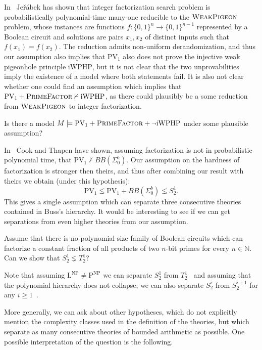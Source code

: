 \documentclass{lmcs}
\newcommand{\PV}{\text{PV}}
\newcommand{\PrimeFactor}{\textsc{PrimeFactor}}
\newcommand{\NN}{\mathbb{N}}
\begin{document}
In~\cite{JERABEK2016380} Jeřábek has shown that integer factorization search problem is probabilistically polynomial-time many-one reducible to the $\textsc{WeakPigeon}$ problem, whose instances are functions $f:\{0,1\}^n\to \{0,1\}^{n-1}$ represented by a Boolean circuit and solutions are pairs $x_1,x_2$ of distinct inputs such that $f(x_1)=f(x_2)$. The reduction admits non-uniform derandomization, and thus our assumption also implies that $\text{PV}_1$ also does not prove the injective weak pigeonhole principle $\text{iWPHP}$, but it is not clear that the two unprovabilities imply the existence of a model where both statements fail. It is also not clear whether one could find an assumption which implies that $\PV_1 +\PrimeFactor\nvdash \text{iWPHP}$, as there could plausibly be a some reduction from $\textsc{WeakPigeon}$ to integer factorization.
\begin{qu}
    Is there a model $M\models \text{PV}_1+\PrimeFactor+\lnot\text{iWPHP}$ under some plausible assumption?
\end{qu}

In~\cite{cookthapen2006} Cook and Thapen have shown, assuming factorization is not in probabilistic polynomial time, that $\PV_1 \nvdash BB(\Sigma^b_0)$. Our assumption on the hardness of factorization is stronger then theirs, and thus after combining our result with theirs we obtain (under this hypothesis):
\[ \PV_1 \lneq \PV_1+ BB(\Sigma^b_0) \lneq S^1_2.\]
This gives a single assumption which can separate three consecutive theories contained in Buss's hierarchy. It would be interesting to see if we can get separations from even higher theories from our assumption.

\begin{qu}
    Assume that there is no polynomial-size family of Boolean circuits which can factorize a constant fraction of all products of two $n$-bit primes for every $n\in\NN$. Can we show that  $S^1_2\lneq T^1_2$?
\end{qu}

Note that assuming $\text{L}^{\text{NP}} \neq \text{P}^{\text{NP}}$ we can separate $S^1_2$ from $T^1_2$~\cite{krajivcek1993fragments} and assuming that the polynomial hierarchy does not collapse, we can also separate $S^i_2$ from $S^{i+1}_2$ for any $i\geq 1$~\cite{krajicek1991bounded}. 

More generally, we can ask about other hypotheses, which do not explicitly mention the complexity classes used in the definition of the theories, but which separate as many consecutive theories of bounded arithmetic as possible. One possible interpretation of the question is the following.
\end{document}
